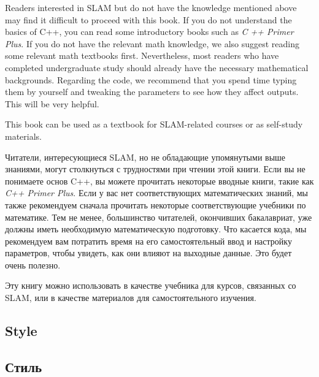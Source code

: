 \begin{English}
    Readers interested in SLAM but do not have the knowledge mentioned above may find it difficult to proceed with this book. If you do not understand the basics of C++, you can read some introductory books such as \textit{C ++ Primer Plus}. If you do not have the relevant math knowledge, we also suggest reading some relevant math textbooks first. Nevertheless, most readers who have completed undergraduate study should already have the necessary mathematical backgrounds. Regarding the code, we recommend that you spend time typing them by yourself and tweaking the parameters to see how they affect outputs. This will be very helpful.

    This book can be used as a textbook for SLAM-related courses or as self-study materials.
\end{English}

\begin{Russian}
    Читатели, интересующиеся SLAM, но не обладающие упомянутыми выше знаниями, могут столкнуться с трудностями при чтении этой книги. Если вы не понимаете основ C++, вы можете прочитать некоторые вводные книги, такие как \textit{C++ Primer Plus}. Если у вас нет соответствующих математических знаний, мы также рекомендуем сначала прочитать некоторые соответствующие учебники по математике. Тем не менее, большинство читателей, окончивших бакалавриат, уже должны иметь необходимую математическую подготовку. Что касается кода, мы рекомендуем вам потратить время на его самостоятельный ввод и настройку параметров, чтобы увидеть, как они влияют на выходные данные. Это будет очень полезно.

     Эту книгу можно использовать в качестве учебника для курсов, связанных со SLAM, или в качестве материалов для самостоятельного изучения.
\end{Russian}

\begin{English}
    \section*{Style}
\end{English}

\begin{Russian}
    \section*{Стиль}
\end{Russian}

